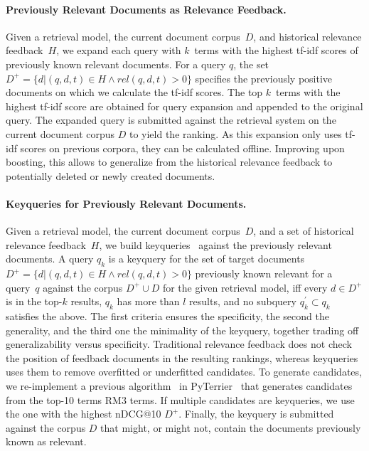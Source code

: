 \paragraph{Previously Relevant Documents as Relevance Feedback.} Given a retrieval model, the current document corpus~$D$, and historical relevance feedback~$H$, we expand each query with $k$~terms with the highest tf-idf scores of previously known relevant documents. For a query $q$, the set $D^{+} = \{d| (q,d,t) \in H \wedge rel(q,d,t) > 0\}$ specifies the previously positive documents on which we calculate the tf-idf scores. The top $k$~terms with the highest tf-idf score are obtained for query expansion and appended to the original query. The expanded query is submitted against the retrieval system on the current document corpus $D$ to yield the ranking. As this expansion only uses tf-idf scores on  previous corpora, they can be calculated offline. Improving upon boosting, this allows to generalize from the historical relevance feedback to potentially deleted or newly created documents.


\paragraph{Keyqueries for Previously Relevant Documents.} Given a retrieval model, the current document corpus~$D$, and a set of historical relevance feedback~$H$, we build keyqueries~\cite{froebe:2021c,gollub:2013a,hagen:2016b} against the previously relevant documents. A query $q_{k}$ is a keyquery for the set of target documents $D^{+} = \{d| (q,d,t) \in H \wedge rel(q,d,t) > 0\}$ previously known relevant for a query~$q$ against the corpus $D^{+} \cup D$ for the given retrieval model, iff \Ni every $d \in D^{+}$ is in the top-$k$ results, \Nii $q_{k}$ has more than $l$ results, and \Niii no subquery $q^{'}_{k} \subset q_{k}$ satisfies the above. The first criteria ensures the specificity, the second the generality, and the third one the minimality of the keyquery, together trading off generalizability versus specificity. Traditional relevance feedback does not check the position of feedback documents in the resulting rankings, whereas keyqueries uses them to remove overfitted or underfitted candidates. To generate candidates, we re-implement a previous algorithm~\cite{froebe:2022c} in PyTerrier~\cite{macdonald:2020} that generates candidates from the top-10 terms RM3 terms. If multiple candidates are keyqueries, we use the one with the highest nDCG@10 $D^{+}$. Finally, the keyquery is submitted against the corpus $D$ that might, or might not, contain the documents previously known as relevant.


